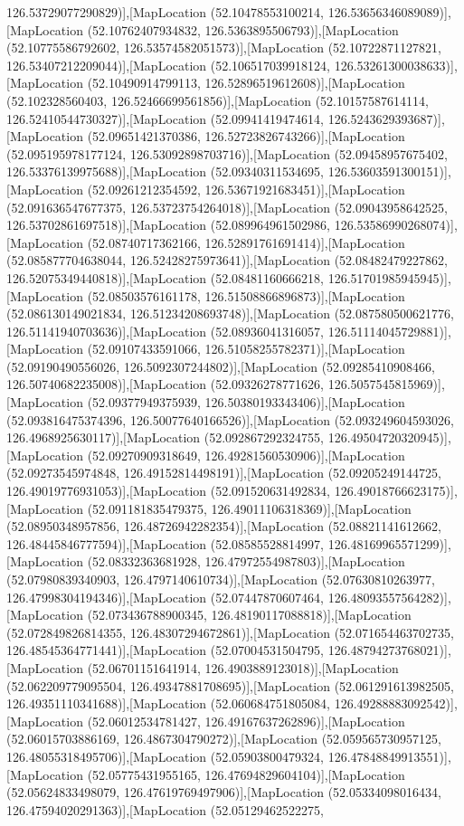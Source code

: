 126.53729077290829)],[MapLocation (52.10478553100214, 126.53656346089089)],[MapLocation (52.10762407934832, 126.5363895506793)],[MapLocation (52.10775586792602, 126.53574582051573)],[MapLocation (52.10722871127821, 126.53407212209044)],[MapLocation (52.106517039918124, 126.53261300038633)],[MapLocation (52.10490914799113, 126.52896519612608)],[MapLocation (52.102328560403, 126.52466699561856)],[MapLocation (52.10157587614114, 126.52410544730327)],[MapLocation (52.09941419474614, 126.5243629393687)],[MapLocation (52.09651421370386, 126.52723826743266)],[MapLocation (52.095195978177124, 126.53092898703716)],[MapLocation (52.09458957675402, 126.53376139975688)],[MapLocation (52.09340311534695, 126.53603591300151)],[MapLocation (52.09261212354592, 126.53671921683451)],[MapLocation (52.091636547677375, 126.53723754264018)],[MapLocation (52.09043958642525, 126.53702861697518)],[MapLocation (52.089964961502986, 126.53586990268074)],[MapLocation (52.08740717362166, 126.52891761691414)],[MapLocation (52.085877704638044, 126.52428275973641)],[MapLocation (52.08482479227862, 126.52075349440818)],[MapLocation (52.08481160666218, 126.51701985945945)],[MapLocation (52.08503576161178, 126.51508866896873)],[MapLocation (52.086130149021834, 126.51234208693748)],[MapLocation (52.087580500621776, 126.51141940703636)],[MapLocation (52.08936041316057, 126.51114045729881)],[MapLocation (52.09107433591066, 126.51058255782371)],[MapLocation (52.09190490556026, 126.5092307244802)],[MapLocation (52.09285410908466, 126.50740682235008)],[MapLocation (52.09326278771626, 126.5057545815969)],[MapLocation (52.09377949375939, 126.50380193343406)],[MapLocation (52.093816475374396, 126.50077640166526)],[MapLocation (52.093249604593026, 126.4968925630117)],[MapLocation (52.092867292324755, 126.49504720320945)],[MapLocation (52.09270909318649, 126.49281560530906)],[MapLocation (52.09273545974848, 126.49152814498191)],[MapLocation (52.09205249144725, 126.49019776931053)],[MapLocation (52.091520631492834, 126.49018766623175)],[MapLocation (52.091181835479375, 126.49011106318369)],[MapLocation (52.08950348957856, 126.48726942282354)],[MapLocation (52.08821141612662, 126.48445846777594)],[MapLocation (52.08585528814997, 126.48169965571299)],[MapLocation (52.08332363681928, 126.47972554987803)],[MapLocation (52.07980839340903, 126.4797140610734)],[MapLocation (52.07630810263977, 126.47998304194346)],[MapLocation (52.07447870607464, 126.48093557564282)],[MapLocation (52.073436788900345, 126.48190117088818)],[MapLocation (52.072849826814355, 126.48307294672861)],[MapLocation (52.071654463702735, 126.48545364771441)],[MapLocation (52.07004531504795, 126.48794273768021)],[MapLocation (52.06701151641914, 126.4903889123018)],[MapLocation (52.062209779095504, 126.49347881708695)],[MapLocation (52.061291613982505, 126.49351110341688)],[MapLocation (52.060684751805084, 126.49288883092542)],[MapLocation (52.06012534781427, 126.49167637262896)],[MapLocation (52.06015703886169, 126.4867304790272)],[MapLocation (52.059565730957125, 126.48055318495706)],[MapLocation (52.05903800479324, 126.47848849913551)],[MapLocation (52.05775431955165, 126.47694829604104)],[MapLocation (52.05624833498079, 126.47619769497906)],[MapLocation (52.05334098016434, 126.47594020291363)],[MapLocation (52.05129462522275, 